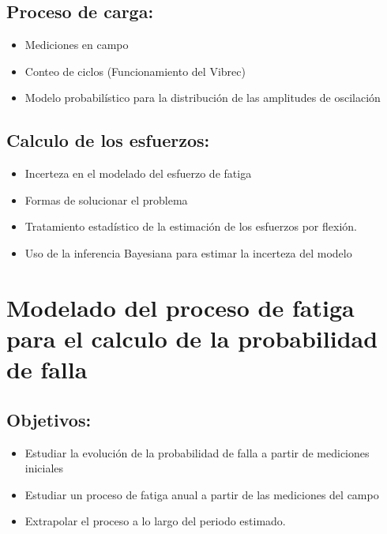 \documentclass[11pt]{article}
\begin{document}
\subsection{Proceso de carga:}
\label{sec:org785c917}
\begin{itemize}
\item Mediciones en campo
\item Conteo de ciclos (Funcionamiento del Vibrec)
\item Modelo probabilístico para la distribución de las amplitudes de oscilación
\end{itemize}
\subsection{Calculo de los esfuerzos:}
\label{sec:orgb6ff10a}
\begin{itemize}
\item Incerteza en el modelado del esfuerzo de fatiga
\item Formas de solucionar el problema
\item Tratamiento estadístico de la estimación de los esfuerzos por flexión.
\item Uso de la inferencia Bayesiana para estimar la incerteza del modelo
\end{itemize}
\section{Modelado del proceso de fatiga para el calculo de la probabilidad de falla}
\label{sec:orgbf8c7d1}
\subsection{Objetivos:}
\label{sec:org44fc1a9}
\begin{itemize}
\item Estudiar la evolución de la probabilidad de falla a partir de mediciones iniciales
\item Estudiar un proceso de fatiga anual a partir de las mediciones del campo
\item Extrapolar el proceso a lo largo del periodo estimado.
\end{itemize}
\end{document}
